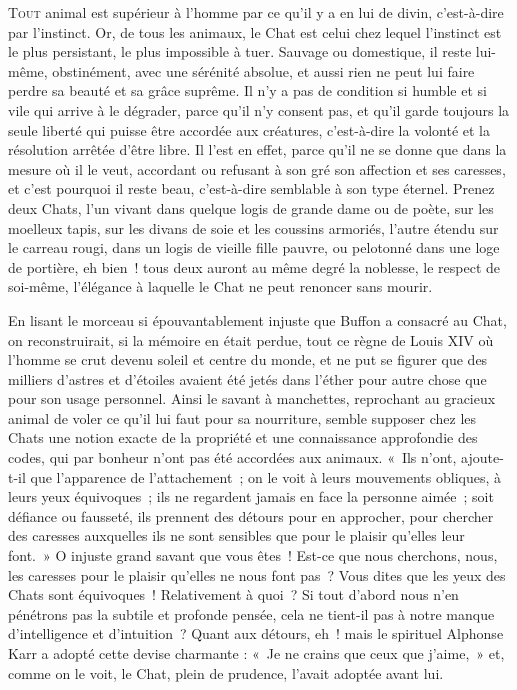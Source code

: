 \documentclass[openany]{book} %
\begin{document}
\lettrine[lines=\INITIALxLETTERxSIZE, lhang=0.33, loversize=0.25]{T}{out} animal est supérieur à l'homme par ce qu'il y a en lui de divin, c'est-à-dire par l'instinct. Or, de tous les animaux, le Chat est celui chez lequel l'instinct est le plus persistant, le plus impossible à tuer. Sauvage ou domestique, il reste lui-même, obstinément, avec une sérénité absolue, et aussi rien ne peut lui faire perdre sa beauté et sa grâce suprême. Il n'y a pas de condition si humble et si vile qui arrive à le dégrader, parce qu'il n'y consent pas, et qu'il garde toujours la seule liberté qui puisse être accordée aux créatures, c'est-à-dire la volonté et la résolution arrêtée d'être libre. Il l'est en effet, parce qu'il ne se donne que dans la mesure où il le veut, accordant ou refusant à son gré son affection et ses caresses, et c'est pourquoi il reste beau, c'est-à-dire semblable à son type éternel. Prenez deux Chats, l'un vivant dans quelque logis de grande dame ou de poète, sur les moelleux tapis, sur les divans de soie et les coussins armoriés, l'autre étendu sur le carreau rougi, dans un logis de vieille fille pauvre, ou pelotonné dans une loge de portière, eh bien~! tous deux auront au même degré la noblesse, le respect de soi-même, l'élégance à laquelle le Chat ne peut renoncer sans mourir.

\bigskip
En lisant le morceau si épouvantablement injuste que Buffon a consacré au Chat, on reconstruirait, si la mémoire en était perdue, tout ce règne de Louis XIV où l'homme se crut devenu soleil et centre du monde, et ne put se figurer que des milliers d'astres et d'étoiles avaient été jetés dans l'éther pour autre chose que pour son usage personnel. Ainsi le savant à manchettes, reprochant au gracieux animal de voler ce qu'il lui faut pour sa nourriture, semble supposer chez les Chats une notion exacte de la propriété et une connaissance approfondie des codes, qui par bonheur n'ont pas été accordées aux animaux. «~Ils n'ont, ajoute-t-il que l'apparence de l'attachement~; on le voit à leurs mouvements obliques, à leurs yeux équivoques~; ils ne regardent jamais en face la personne aimée~; soit défiance ou fausseté, ils prennent des détours pour en approcher, pour chercher des caresses auxquelles ils ne sont sensibles que pour le plaisir qu'elles leur font.~» O injuste grand savant que vous êtes~! Est-ce que nous cherchons, nous, les caresses pour le plaisir qu'elles ne nous font pas~? Vous dites que les yeux des Chats sont équivoques~! Relativement à quoi~? Si tout d'abord nous n'en pénétrons pas la subtile et profonde pensée, cela ne tient-il pas à notre manque d'intelligence et d'intuition~? Quant aux détours, eh~! mais le spirituel Alphonse Karr a adopté cette devise charmante : «~Je ne crains que ceux que j'aime,~» et, comme on le voit, le Chat, plein de prudence, l'avait adoptée avant lui.
\end{document}
